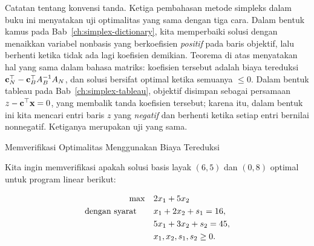 \label{par:matrix-sign-conventions}%
Catatan tentang konvensi tanda.  Ketiga pembahasan metode simpleks dalam buku ini menyatakan uji optimalitas yang sama dengan tiga cara.  Dalam bentuk kamus pada Bab~\ref{ch:simplex-dictionary}, kita memperbaiki solusi dengan menaikkan variabel nonbasis yang berkoefisien \emph{positif} pada baris objektif, lalu berhenti ketika tidak ada lagi koefisien demikian.  Teorema di atas menyatakan hal yang sama dalam bahasa matriks: koefisien tersebut adalah biaya tereduksi $\mathbf{c}_N^\top -\mathbf{c}_B^\top A_B^{-1} A_N$, dan solusi bersifat optimal ketika semuanya $\leq 0$.  Dalam bentuk tableau pada Bab~\ref{ch:simplex-tableau}, objektif disimpan sebagai persamaan $z - \mathbf{c}^\top\mathbf{x} = 0$, yang membalik tanda koefisien tersebut; karena itu, dalam bentuk ini kita mencari entri baris $z$ yang \emph{negatif} dan berhenti ketika setiap entri bernilai nonnegatif.  Ketiganya merupakan uji yang sama.

\begin{example}{Memverifikasi Optimalitas Menggunakan Biaya Tereduksi}{}

Kita ingin memverifikasi apakah solusi basis layak \( (6,5) \) dan \( (0,8) \) optimal untuk program linear berikut:

\[
\begin{aligned}
    \max \quad & 2 x_1 + 5 x_2 \\
    \mbox{dengan syarat}\quad \quad 
    & x_1 + 2x_2 + s_1 = 16, \\
    & 5x_1 + 3x_2 + s_2 = 45, \\
    & x_1, x_2, s_1, s_2 \geq 0.
\end{aligned}
\]
\end{example}

